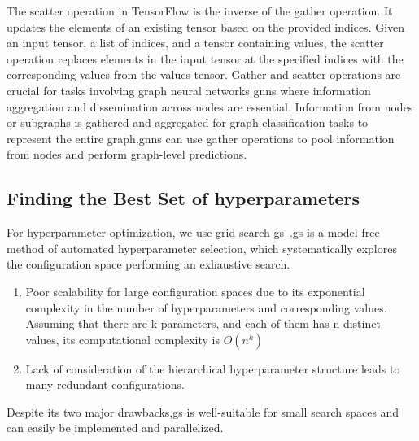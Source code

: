 The scatter operation in TensorFlow is the inverse of the gather operation. It updates the elements of an existing tensor based on the provided indices. Given an input tensor, a list of indices, and a tensor containing values, the scatter operation replaces elements in the input tensor at the specified indices with the corresponding values from the values tensor.
Gather and scatter operations are crucial for tasks involving graph neural networks \acp{gnn} where information aggregation and dissemination across nodes are essential. Information from nodes or subgraphs is gathered and aggregated for graph classification tasks to represent the entire graph.\acp{gnn} can use gather operations to pool information from nodes and perform graph-level predictions.

\subsection{Finding the Best Set of hyperparameters}
\label{sec:implement:setup: gridsearch}

For hyperparameter optimization, we use grid search \ac{gs}~\cite{Lorenzo2017,Yang2020,Zoeller2021}.\Ac{gs} is a model-free method of automated hyperparameter selection, which systematically explores the configuration space performing an exhaustive search.
\begin{enumerate}
    \item Poor scalability for large configuration spaces due to its exponential complexity in the number of hyperparameters and corresponding values. Assuming that there are k parameters, and each of them has n distinct values, its computational complexity is $O(n^{k})$
    \item Lack of consideration of the hierarchical hyperparameter structure leads to many redundant configurations.
\end{enumerate}
Despite its two major drawbacks,\ac{gs} is well-suitable for small search spaces and can easily be implemented and parallelized.